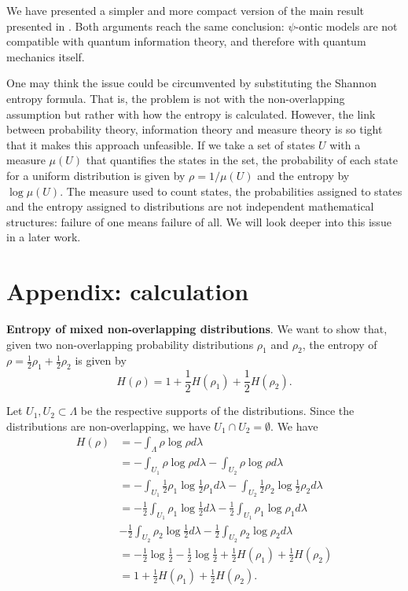 \documentclass[10pt,twocolumn, nofootinbib]{revtex4-2}
\begin{document}
We have presented a simpler and more compact version of the main result presented in \cite{Carcassi:2022}. Both arguments reach the same conclusion: $\psi$-ontic models are not compatible with quantum information theory, and therefore with quantum mechanics itself.

One may think the issue could be circumvented by substituting the Shannon entropy formula. That is, the problem is not with the non-overlapping assumption but rather with how the entropy is calculated. However, the link between probability theory, information theory and measure theory is so tight that it makes this approach unfeasible. If we take a set of states $U$ with a measure $\mu(U)$ that quantifies the states in the set, the probability of each state for a uniform distribution is given by $\rho = 1 / \mu(U)$ and the entropy by $\log \mu(U)$. The measure used to count states, the probabilities assigned to states and the entropy assigned to distributions are not independent mathematical structures: failure of one means failure of all. We will look deeper into this issue in a later work.



\clearpage

\section*{Appendix: calculation}
\label{A}
\textbf{Entropy of mixed non-overlapping distributions}. We want to show that, given two non-overlapping probability distributions $\rho_1$ and $\rho_2$, the entropy of $\rho = \frac{1}{2} \rho_1 + \frac{1}{2} \rho_2$ is given by
\begin{equation}
	H(\rho) = 1 + \frac{1}{2} H(\rho_1) + \frac{1}{2} H(\rho_2).
\end{equation}

Let $U_1, U_2 \subset \Lambda$ be the respective supports of the distributions. Since the distributions are non-overlapping, we have $U_1 \cap U_2 = \emptyset$. We have
\begin{align*}
	H(\rho) &= - \int_\Lambda \rho \log \rho d\lambda \\
	&= -\int_{U_1} \rho \log \rho d\lambda -\int_{U_2} \rho \log \rho d\lambda \\
	&= -\int_{U_1} \frac{1}{2} \rho_1 \log \frac{1}{2} \rho_1 d\lambda -\int_{U_2} \frac{1}{2} \rho_2 \log \frac{1}{2} \rho_2 d\lambda \\
	&= - \frac{1}{2} \int_{U_1} \rho_1 \log \frac{1}{2} d\lambda - \frac{1}{2} \int_{U_1} \rho_1 \log \rho_1 d\lambda \\
	&- \frac{1}{2} \int_{U_2} \rho_2 \log \frac{1}{2} d\lambda - \frac{1}{2} \int_{U_2} \rho_2 \log \rho_2 d\lambda \\
	&= - \frac{1}{2} \log \frac{1}{2} - \frac{1}{2} \log \frac{1}{2} + \frac{1}{2} H(\rho_1) + \frac{1}{2} H(\rho_2) \\
	&= 1 + \frac{1}{2} H(\rho_1) + \frac{1}{2} H(\rho_2). \\
\end{align*}
\end{document}

